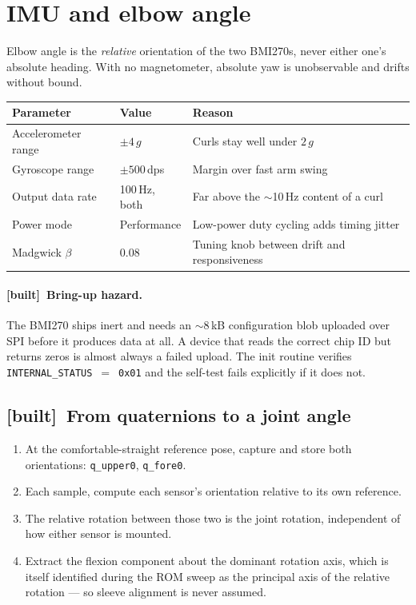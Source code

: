 \documentclass[11pt]{article}
\newcommand{\built}{{\sffamily\scriptsize\color{good}\textbf{[built]}}\ }
\begin{document}
\section{IMU and elbow angle}

Elbow angle is the \emph{relative} orientation of the two BMI270s, never
either one's absolute heading. With no magnetometer, absolute yaw is
unobservable and drifts without bound.

\begin{table}[H]
\centering\small
\begin{tabularx}{\linewidth}{@{}p{34mm} p{30mm} X@{}}
\toprule
\textbf{Parameter} & \textbf{Value} & \textbf{Reason} \\
\midrule
Accelerometer range & $\pm4\,g$ & Curls stay well under $2\,g$ \\
Gyroscope range & $\pm500$\,dps & Margin over fast arm swing \\
Output data rate & 100\,Hz, both & Far above the $\sim$10\,Hz content of a curl \\
Power mode & Performance & Low-power duty cycling adds timing jitter \\
Madgwick $\beta$ & 0.08 & Tuning knob between drift and responsiveness \\
\bottomrule
\end{tabularx}
\end{table}

\paragraph{\built Bring-up hazard.} The BMI270 ships inert and needs an
$\sim$8\,kB configuration blob uploaded over SPI before it produces data at
all. A device that reads the correct chip ID but returns zeros is almost
always a failed upload. The init routine verifies
\texttt{INTERNAL\_STATUS}~$=$~\texttt{0x01} and the self-test fails explicitly
if it does not.

\subsection{\built From quaternions to a joint angle}

\begin{enumerate}
\item At the comfortable-straight reference pose, capture and store both
orientations: \texttt{q\_upper0}, \texttt{q\_fore0}.
\item Each sample, compute each sensor's orientation relative to its own
reference.
\item The relative rotation between those two is the joint rotation,
independent of how either sensor is mounted.
\item Extract the flexion component about the dominant rotation axis, which is
itself identified during the ROM sweep as the principal axis of the relative
rotation --- so sleeve alignment is never assumed.
\end{enumerate}
\end{document}
